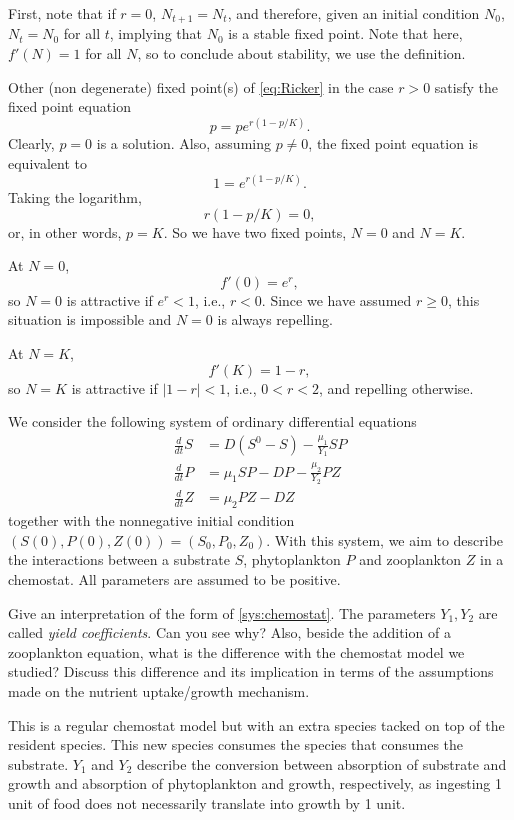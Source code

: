 \documentclass[12pt]{article}
\theoremstyle{plain}
\begin{document}
First, note that if $r=0$, $N_{t+1}=N_t$, and therefore, given an initial condition $N_0$, $N_{t}=N_0$ for all $t$, implying that $N_0$ is a stable fixed point. Note that here, $f'(N)=1$ for all $N$, so to conclude about stability, we use the definition.

Other (non degenerate) fixed point(s) of \eqref{eq:Ricker} in the case $r>0$ satisfy the fixed point equation
\[
p=pe^{r(1-p/K)}.
\]
Clearly, $p=0$ is a solution. Also, assuming $p\neq 0$, the fixed point equation is equivalent to
\[
1=e^{r(1-p/K)}.
\]
Taking the logarithm,
\[
r(1-p/K)=0,
\]
or, in other words, $p=K$. So we have two fixed points, $N=0$ and $N=K$. 

At $N=0$,
\[
f'(0)=e^r,
\]
so $N=0$ is attractive if $e^r<1$, i.e., $r<0$. Since we have assumed $r\geq 0$, this situation is impossible and $N=0$ is always repelling.

At $N=K$,
\[
f'(K)=1-r,
\]
so $N=K$ is attractive if $|1-r|<1$, i.e., $0<r<2$, and repelling otherwise.





\newpage
{}
We consider the following system of ordinary differential equations
\begin{subequations}\label{sys:chemostat}
\begin{align}
\frac{d}{dt} S &= D(S^0-S)-\frac{\mu_1}{Y_1}SP \label{sys:chemostat_S} \\
\frac{d}{dt} P &= \mu_1 SP -DP-\frac{\mu_2}{Y_2}PZ \label{sys:chemostat_P} \\
\frac{d}{dt} Z &= \mu_2 PZ-DZ \label{sys:chemostat_Z} 
\end{align}
\end{subequations}
together with the nonnegative initial condition $(S(0),P(0),Z(0))=(S_0,P_0,Z_0)$. With this system, we aim to describe the interactions between a substrate $S$, phytoplankton $P$ and zooplankton $Z$ in a chemostat. All parameters are assumed to be positive.

Give an interpretation of the form of \eqref{sys:chemostat}. The parameters $Y_1,Y_2$ are called \emph{yield coefficients}. Can you see why? Also, beside the addition of a zooplankton equation, what is the difference with the chemostat model we studied? Discuss this difference and its implication in terms of the assumptions made on the nutrient uptake/growth mechanism.

This is a regular chemostat model but with an extra species tacked on top of the resident species. This new species consumes the species that consumes the substrate. $Y_1$ and $Y_2$ describe the conversion between absorption of substrate and growth and absorption of phytoplankton and growth, respectively, as ingesting 1 unit of food does not necessarily translate into growth by 1 unit.
\end{document}
